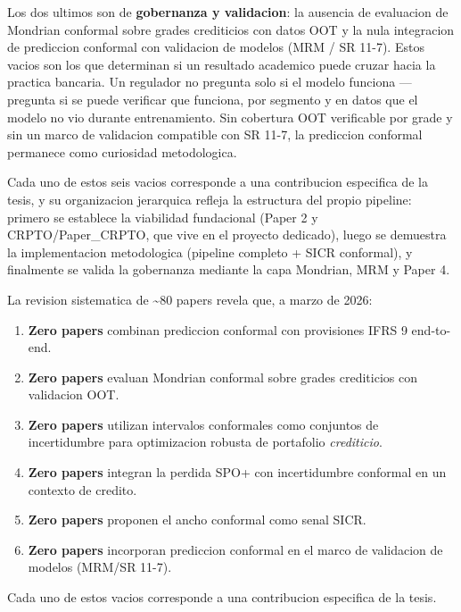 \documentclass[
  spanish,
  11pt,
  letterpaper,
]{scrbook}
\providecommand{\tightlist}{%
  \setlength{\itemsep}{0pt}\setlength{\parskip}{0pt}}
\theoremstyle{plain}
\theoremstyle{remark}
\begin{document}
Los dos ultimos son de \textbf{gobernanza y validacion}: la ausencia de
evaluacion de Mondrian conformal sobre grades crediticios con datos OOT
y la nula integracion de prediccion conformal con validacion de modelos
(MRM / SR 11-7). Estos vacios son los que determinan si un resultado
academico puede cruzar hacia la practica bancaria. Un regulador no
pregunta solo si el modelo funciona --- pregunta si se puede verificar
que funciona, por segmento y en datos que el modelo no vio durante
entrenamiento. Sin cobertura OOT verificable por grade y sin un marco de
validacion compatible con SR 11-7, la prediccion conformal permanece
como curiosidad metodologica.

Cada uno de estos seis vacios corresponde a una contribucion especifica
de la tesis, y su organizacion jerarquica refleja la estructura del
propio pipeline: primero se establece la viabilidad fundacional (Paper 2
y CRPTO/Paper\_CRPTO, que vive en el proyecto dedicado), luego se
demuestra la implementacion metodologica (pipeline completo + SICR
conformal), y finalmente se valida la gobernanza mediante la capa
Mondrian, MRM y Paper 4.

\begin{tcolorbox}[enhanced jigsaw, arc=.35mm, bottomrule=.15mm, bottomtitle=1mm, breakable, colback=white, colbacktitle=quarto-callout-important-color!10!white, colframe=quarto-callout-important-color-frame, coltitle=black, left=2mm, leftrule=.75mm, opacityback=0, opacitybacktitle=0.6, rightrule=.15mm, title=\textcolor{quarto-callout-important-color}{\faExclamation}\hspace{0.5em}{Seis vacios identificados en la literatura}, titlerule=0mm, toprule=.15mm, toptitle=1mm]

La revision sistematica de \textasciitilde80 papers revela que, a marzo
de 2026:

\begin{enumerate}
\def\labelenumi{\arabic{enumi}.}
\tightlist
\item
  \textbf{Zero papers} combinan prediccion conformal con provisiones
  IFRS 9 end-to-end.
\item
  \textbf{Zero papers} evaluan Mondrian conformal sobre grades
  crediticios con validacion OOT.
\item
  \textbf{Zero papers} utilizan intervalos conformales como conjuntos de
  incertidumbre para optimizacion robusta de portafolio
  \emph{crediticio}.
\item
  \textbf{Zero papers} integran la perdida SPO+ con incertidumbre
  conformal en un contexto de credito.
\item
  \textbf{Zero papers} proponen el ancho conformal como senal SICR.
\item
  \textbf{Zero papers} incorporan prediccion conformal en el marco de
  validacion de modelos (MRM/SR 11-7).
\end{enumerate}

Cada uno de estos vacios corresponde a una contribucion especifica de la
tesis.

\end{tcolorbox}
\end{document}
